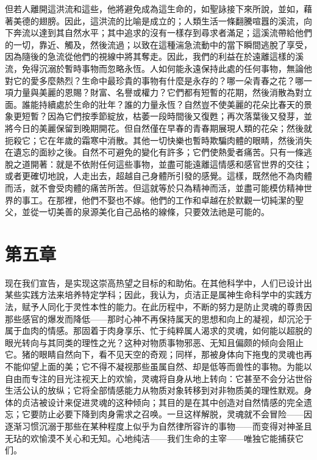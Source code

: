 但若人離開這洪流和這些，他將避免成為這生命的，如聖詠接下來所說，並如，藉著美德的翅膀。因此，這洪流的比喻是成立的；人類生活一條翻騰喧囂的溪流，向下奔流以達到其自然水平；其中追求的沒有一樣存到尋求者滿足；這溪流帶給他們的一切，靠近、觸及，然後流過；以致在這種湍急流動中的當下瞬間逃脫了享受，因為隨後的急流從他們的視線中將其奪走。因此，我們的利益在於遠離這樣的溪流，免得沉溺於暫時事物而忽略永恆。人如何能永遠保持此處的任何事物，無論他對它的愛多麼熱烈？生命中最珍貴的事物有什麼是永存的？哪一朵青春之花？哪一項力量與美麗的恩賜？財富、名譽或權力？它們都有短暫的花期，然後消散為對立面。誰能持續處於生命的壯年？誰的力量永恆？自然豈不使美麗的花朵比春天的景象更短暫？因為它們按季節綻放，枯萎一段時間後又復甦；再次落葉後又發芽，並將今日的美麗保留到晚期開花。但自然僅在早春的青春期展現人類的花朵；然後就扼殺它；它在年歲的霜寒中消散。其他一切快樂也暫時欺騙肉體的眼睛，然後消失在遺忘的面紗之後。自然不可避免的變化有許多；它們使熱愛者痛苦。只有一條逃脫之道開著：就是不依附任何這些事物，並盡可能遠離這情感和感官世界的交往；或者更確切地說，人走出去，超越自己身體所引發的感覺。這樣，既然他不為肉體而活，就不會受肉體的痛苦所苦。但這就等於只為精神而活，並盡可能模仿精神世界的事工。在那裡，他們不娶也不嫁。他們的工作和卓越在於默觀一切純潔的聖父，並從一切美善的泉源美化自己品格的線條，只要效法祂是可能的。\par


\section{第五章}

现在我们宣告，是实现这崇高热望之目标的和助佑。在其他科学中，人们已设计出某些实践方法来培养特定学科；因此，我认为，贞洁正是属神生命科学中的实践方法，赋予人同化于灵性本性的能力。在此历程中，不断的努力是防止灵魂的尊贵因那些感官的爆发而降低——那时心神不再保持属天的思想和向上的凝视，却沉沦于属于血肉的情感。那固着于肉身享乐、忙于纯粹属人渴求的灵魂，如何能以超脱的眼光转向与其同类的理性之光？这种对物质事物邪恶、无知且偏颇的倾向会阻止它。猪的眼睛自然向下，看不见天空的奇观；同样，那被身体向下拖曳的灵魂也再不能仰望上面的美；它不得不凝视那些虽属自然、却是低等而兽性的事物。为能以自由而专注的目光注视天上的欢愉，灵魂将自身从地上转向：它甚至不会分沾世俗生活公认的放纵；它将全部情感能力从物质对象转移到对非物质美的理性默观。身体的贞洁被设计来促进灵魂的这种倾向；其目的是在其中创造对自然情感的完全遗忘；它要防止必要下降到肉身需求之召唤。一旦这样解脱，灵魂就不会冒险——因逐渐习惯沉溺于那些在某种程度上似乎为自然律所容许的事物——而变得对神圣且无玷的欢愉漠不关心和无知。心地纯洁——我们生命的主宰——唯独它能捕获它们。\par

